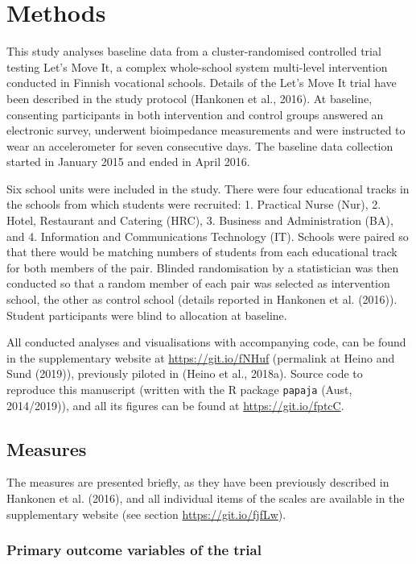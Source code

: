\documentclass[british,man]{apa6}
\begin{document}
\hypertarget{methods}{%
\section{Methods}\label{methods}}

This study analyses baseline data from a cluster-randomised controlled trial testing Let's Move It, a complex whole-school system multi-level intervention conducted in Finnish vocational schools. Details of the Let's Move It trial have been described in the study protocol (Hankonen et al., 2016). At baseline, consenting participants in both intervention and control groups answered an electronic survey, underwent bioimpedance measurements and were instructed to wear an accelerometer for seven consecutive days. The baseline data collection started in January 2015 and ended in April 2016.

Six school units were included in the study. There were four educational tracks in the schools from which students were recruited: 1. Practical Nurse (Nur), 2. Hotel, Restaurant and Catering (HRC), 3. Business and Administration (BA), and 4. Information and Communications Technology (IT). Schools were paired so that there would be matching numbers of students from each educational track for both members of the pair. Blinded randomisation by a statistician was then conducted so that a random member of each pair was selected as intervention school, the other as control school (details reported in Hankonen et al. (2016)). Student participants were blind to allocation at baseline.

All conducted analyses and visualisations with accompanying code, can be found in the supplementary website at \url{https://git.io/fNHuf} (permalink at Heino and Sund (2019)), previously piloted in (Heino et al., 2018a). Source code to reproduce this manuscript (written with the R package \texttt{papaja} (Aust, 2014/2019)), and all its figures can be found at \url{https://git.io/fptcC}.

\hypertarget{measures}{%
\subsection{Measures}\label{measures}}

The measures are presented briefly, as they have been previously described in Hankonen et al. (2016), and all individual items of the scales are available in the supplementary website (see section \url{https://git.io/fjfLw}).

\hypertarget{primary-outcome-variables-of-the-trial}{%
\subsubsection{Primary outcome variables of the trial}\label{primary-outcome-variables-of-the-trial}}
\end{document}
